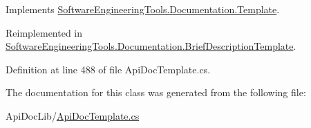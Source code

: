 Implements \hyperlink{class_software_engineering_tools_1_1_documentation_1_1_template_ab13b45a10b7eb65a0b6c15dbc1318664}{Software\+Engineering\+Tools.\+Documentation.\+Template}.



Reimplemented in \hyperlink{class_software_engineering_tools_1_1_documentation_1_1_brief_description_template_a8e800971557ae734f89ac200352402ab}{Software\+Engineering\+Tools.\+Documentation.\+Brief\+Description\+Template}.



Definition at line 488 of file Api\+Doc\+Template.\+cs.



The documentation for this class was generated from the following file\+:\begin{DoxyCompactItemize}
\item 
Api\+Doc\+Lib/\hyperlink{_api_doc_template_8cs}{Api\+Doc\+Template.\+cs}\end{DoxyCompactItemize}
